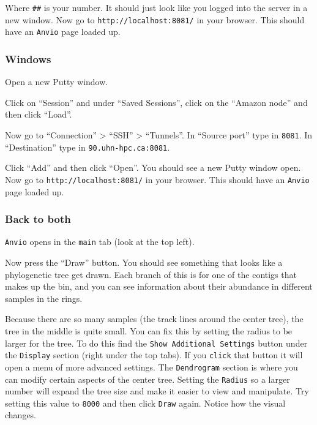 \documentclass[
]{book}
\begin{document}
Where \texttt{\#\#} is your number. It should just look like you logged into the server in a new window. Now go to \texttt{http://localhost:8081/} in your browser. This should have an \texttt{Anvi\textquotesingle{}o} page loaded up.

\subsubsection{Windows}\label{windows}

Open a new Putty window.

Click on ``Session'' and under ``Saved Sessions'', click on the ``Amazon node'' and then click ``Load''.

Now go to ``Connection'' \textgreater{} ``SSH'' \textgreater{} ``Tunnels''. In ``Source port'' type in \texttt{8081}. In ``Destination'' type in \texttt{90.uhn-hpc.ca:8081}.

Click ``Add'' and then click ``Open''. You should see a new Putty window open. Now go to \texttt{http://localhost:8081/} in your browser. This should have an \texttt{Anvi\textquotesingle{}o} page loaded up.

\subsubsection{Back to both}\label{back-to-both}

\texttt{Anvi\textquotesingle{}o} opens in the \texttt{main} tab (look at the top left).

Now press the ``Draw'' button. You should see something that looks like a phylogenetic tree get drawn. Each branch of this is for one of the contigs that makes up the bin, and you can see information about their abundance in different samples in the rings.

Because there are so many samples (the track lines around the center tree), the tree in the middle is quite small. You can fix this by setting the radius to be larger for the tree. To do this find the \texttt{Show\ Additional\ Settings} button under the \texttt{Display} section (right under the top tabs). If you \texttt{click} that button it will open a menu of more advanced settings. The \texttt{Dendrogram} section is where you can modify certain aspects of the center tree. Setting the \texttt{Radius} so a larger number will expand the tree size and make it easier to view and manipulate. Try setting this value to \texttt{8000} and then click \texttt{Draw} again. Notice how the visual changes.
\end{document}
